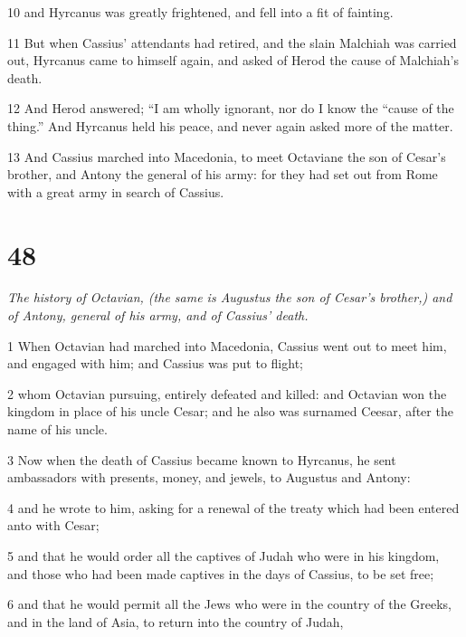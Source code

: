 \par 10 and Hyrcanus was greatly frightened, and fell into a fit of fainting. 

\par 11 But when Cassius’ attendants had retired, and the slain Malchiah was carried out, Hyrcanus came to himself again, and asked of Herod the cause of Malchiah’s death. 

\par 12 And Herod answered; “I am wholly ignorant, nor do I know the “cause of the thing.” And Hyrcanus held his peace, and never again asked more of the matter. 

\par 13 And Cassius marched into Macedonia, to meet Octavian¢ the son of Cesar’s brother, and Antony the general of his army: for they had set out from Rome with a great army in search of Cassius. 

\chapter{48}

\par \textit{The history of Octavian, (the same is Augustus the son of Cesar’s brother,) and of Antony, general of his army, and of Cassius’ death.}

\par 1 When Octavian had marched into Macedonia, Cassius went out to meet him, and engaged with him; and Cassius was put to flight; 

\par 2 whom Octavian pursuing, entirely defeated and killed: and Octavian won the kingdom in place of his uncle Cesar; and he also was surnamed Ceesar, after the name of his uncle. 

\par 3 Now when the death of Cassius became known to Hyrcanus, he sent ambassadors with presents, money, and jewels, to Augustus and Antony: 

\par 4 and he wrote to him, asking for a renewal of the treaty which had been entered anto with Cesar; 

\par 5 and that he would order all the captives of Judah who were in his kingdom, and those who had been made captives in the days of Cassius, to be set free; 

\par 6 and that he would permit all the Jews who were in the country of the Greeks, and in the land of Asia, to return into the country of Judah, 

